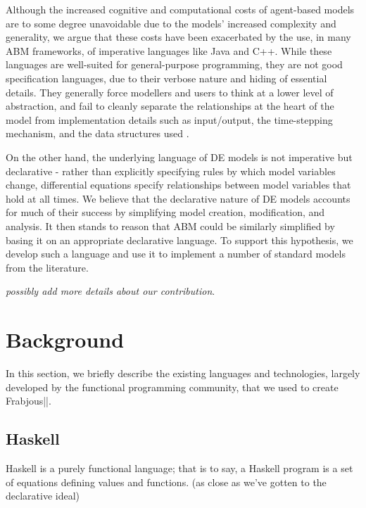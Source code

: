 \documentclass{sig-alternate}
\begin{document}
  Although the increased cognitive and computational costs of agent-based models are to some degree unavoidable due to the models' increased complexity and generality, we argue that these costs have been exacerbated by the use, in many ABM frameworks, of imperative languages like Java and C++. While these languages are well-suited for general-purpose programming, they are not good specification languages, due to their verbose nature and hiding of essential details. They generally force modellers and users to think at a lower level of abstraction, and fail to cleanly separate the relationships at the heart of the model from implementation details such as input/output, the time-stepping mechanism, and the data structures used \cite{system_dyn_tradeoffs}.
  
  On the other hand, the underlying language of DE models is not imperative but declarative - rather than explicitly specifying rules by which model variables change, differential equations specify relationships between model variables that hold at all times. We believe that the declarative nature of DE models accounts for much of their success by simplifying model creation, modification, and analysis. It then stands to reason that ABM could be similarly simplified by basing it on an appropriate declarative language. To support this hypothesis, we develop such a language and use it to implement a number of standard models from the literature. 
  
  \textit{possibly add more details about our contribution}.
  
\section{Background}
In this section, we briefly describe the existing languages and technologies, largely developed by the functional programming community, that we used to create Frabjous||.
\subsection{Haskell}

  Haskell is a purely functional language; that is to say, a Haskell program is a set of equations defining values and functions. (as close as we've gotten to the declarative ideal)


  
  
  
  
   
\end{document}
